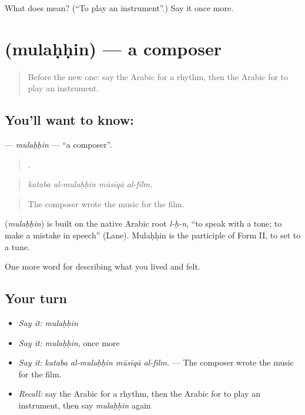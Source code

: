 \begin{tcolorbox}[breakable,colback=teal!4,colframe=teal!35!black,title={Before you move on}]
What does  mean? (\textquotedblleft{}To play an instrument\textquotedblright{}.) Say it once more.
\end{tcolorbox}
\section[\texorpdfstring{\ar{ملحن} (mulaḥḥin)}{ملحن (mulaḥḥin)}]{ (mulaḥḥin) — a composer}

\label{lesson:AR-C543-mulahhin}



\begin{quote}
Before the new one: say the Arabic for a rhythm, then the Arabic for to play an instrument.
\end{quote}

\subsection*{You'll want to know: }
\textbf{} — \emph{mulaḥḥin} — \textquotedblleft{}a composer\textquotedblright{}.

\begin{quote}
   .
\end{quote}

\begin{quote}
\emph{kataba al-mulaḥḥin mūsīqā al-fīlm.}
\end{quote}

\begin{quote}
The composer wrote the music for the film.
\end{quote}

\begin{cousinweb}
\textbf{} (\emph{mulaḥḥin}) is built on the native Arabic root \emph{l-ḥ-n}, \textquotedblleft{}to speak with a tone; to make a mistake in speech\textquotedblright{} (Lane). Mulaḥḥin is the participle of Form II, to set to a tune.
\end{cousinweb}

\begin{grammarlens}[title={What you've built}]
One more word for describing what you lived and felt.
\end{grammarlens}

\subsection*{Your turn}
\begin{itemize}
\raggedright
  \item \emph{Say it:} \emph{mulaḥḥin}
  \item \emph{Say it:} \emph{mulaḥḥin}, once more
  \item \emph{Say it:} \emph{kataba al-mulaḥḥin mūsīqā al-fīlm.} — The composer wrote the music for the film.
  \item \emph{Recall:} say the Arabic for a rhythm, then the Arabic for to play an instrument, then say \emph{mulaḥḥin} again
\end{itemize}


